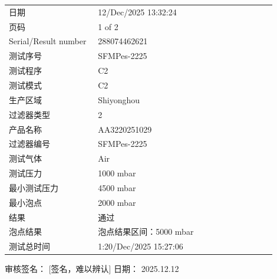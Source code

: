 \documentclass[UTF8,10pt,a4paper,fontset=fandol]{ctexart}
\newcommand{\fieldvalue}[1]{#1}
\newcommand{\handwritten}[1]{#1}
\begin{document}
\begin{tabular}{@{}p{0.30\linewidth}p{0.60\linewidth}@{}}
日期 &
\fieldvalue{12/Dec/2025 13:32:24}
\\
页码 &
\fieldvalue{1 of 2}
\\
Serial/Result number &
\fieldvalue{288074462621}
\\
测试序号 &
\fieldvalue{SFMPes-2225}
\\
测试程序 &
\fieldvalue{C2}
\\
测试模式 &
\fieldvalue{C2}
\\
生产区域 &
\fieldvalue{Shiyonghou}
\\
过滤器类型 &
\fieldvalue{2}
\\
产品名称 &
\fieldvalue{AA3220251029}
\\
过滤器编号 &
\fieldvalue{SFMPes-2225}
\\
测试气体 &
\fieldvalue{Air}
\\
测试压力 &
\fieldvalue{1000 mbar}
\\
最小测试压力 &
\fieldvalue{4500 mbar}
\\
最小泡点 &
\fieldvalue{2000 mbar}
\\
结果 &
\fieldvalue{通过}
\\
泡点结果 &
\fieldvalue{泡点结果区间：5000 mbar}
\\
测试总时间 &
\fieldvalue{1:20/Dec/2025 15:27:06}
\end{tabular}

\vspace{1em}

审核签名：%
\fieldvalue{\handwritten{[签名，难以辨认]}}
\qquad
日期：%
\fieldvalue{\handwritten{2025.12.12}}
\end{document}
